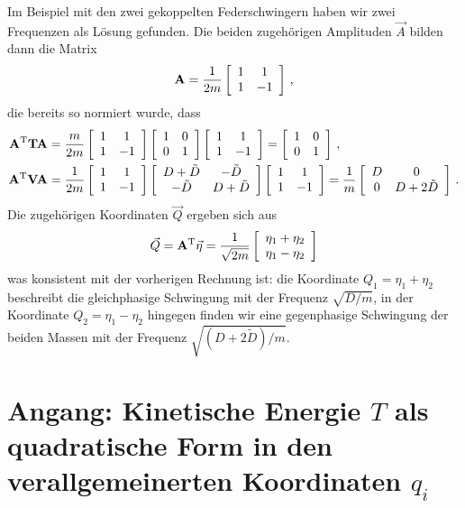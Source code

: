 \documentclass[paper=a4, fontsize=11.0pt, abstractoff, DIV12]{scrartcl}
\begin{document}
Im Beispiel mit den zwei gekoppelten Federschwingern haben wir zwei Frequenzen
als Lösung gefunden. Die beiden zugehörigen Amplituden $\vec A$ bilden dann die
Matrix
\begin{equation}
\mathbf{A} = \frac{1}{2m}\left[ \begin{array}{cc} 1 & 1 \\ 1 & -1 \end{array} \right]\, ,
\end{equation}
die bereits so normiert wurde, dass
\begin{align}
\mathbf{A}^\mathrm{T}\mathbf{T}\mathbf{A} &= \frac{m}{2m}\left[ \begin{array}{cc} 1 & 1 \\ 1 & -1 \end{array} \right]\left[ \begin{array}{cc} 1 & 0 \\ 0 & 1 \end{array} \right]\left[ \begin{array}{cc} 1 & 1 \\ 1 & -1 \end{array} \right] = \left[ \begin{array}{cc} 1 & 0 \\ 0 & 1 \end{array} \right]\, ,\\
\mathbf{A}^\mathrm{T}\mathbf{V}\mathbf{A} &= \frac{1}{2m}\left[ \begin{array}{cc} 1 & 1 \\ 1 & -1 \end{array} \right]\left[ \begin{array}{cc} D+\tilde D & -\tilde D \\ -\tilde D & D+\tilde D \end{array} \right]\left[ \begin{array}{cc} 1 & 1 \\ 1 & -1 \end{array} \right] = \frac{1}{m}\left[ \begin{array}{cc} D & 0 \\ 0 & D+2\tilde D \end{array} \right]\, .
\end{align}
Die zugehörigen Koordinaten $\vec Q$ ergeben sich aus
\begin{align}
\vec{Q} = \mathbf{A}^\mathrm{T} \vec{\eta} = \frac{1}{\sqrt{2m}}\ZweierVec{\eta_1 + \eta_2}{\eta_1-\eta_2}
\end{align}
was konsistent mit der vorherigen Rechnung ist: die Koordinate $Q_1 = \eta_1 + \eta_2$
beschreibt die gleichphasige Schwingung mit der Frequenz $\sqrt{D/m}$, in der
Koordinate $Q_2 = \eta_1 - \eta_2$ hingegen finden wir eine gegenphasige
Schwingung der beiden Massen mit der Frequenz $\sqrt{(D+2\tilde D)/m}$.






\section*{Angang: Kinetische Energie $T$ als quadratische Form in den verallgemeinerten Koordinaten $q_i$}
\end{document}
